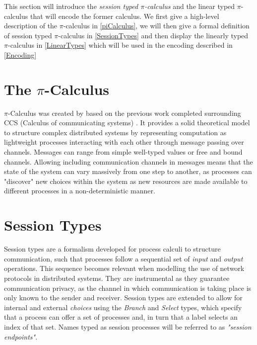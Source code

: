 


This section will introduce the \textit{session typed $\pi$-calculus} \cite{dardha2017session} and the linear typed $\pi$-calculus that will encode the former calculus. We first give a high-level description of the $\pi$-calculus in \autoref{piCalculus}, we will then give a formal definition of session typed $\pi$-calculus in \autoref{SessionTypes} and then display the linearly typed $\pi$-calculus in \autoref{LinearTypes} which will be used in the encoding described in \autoref{Encoding}



\section{The $\pi$-Calculus} \label{piCalculus}
$\pi$-Calculus was created by \citep{milner1992calculus} based on the previous work completed surrounding CCS (Calculus of communicating systems) \cite{milner1980calculus}. It provides a solid theoretical model to structure complex distributed systems by representing computation as lightweight processes interacting with each other through message passing over channels. Messages can range from simple well-typed values or free and bound channels. Allowing including communication channels in messages means that the state of the system can vary massively from one step to another, as processes can "discover" new choices within the system as new resources are made available to different processes in a non-deterministic manner.  

\section{Session Types} \label{SessionTypes}

Session types are a formalism developed for process calculi to structure communication, such that processes follow a sequential set of \textit{input} and \textit{output} operations. This sequence becomes relevant when modelling the use of network protocols in distributed systems. They are instrumental as they guarantee communication privacy, as the channel in which communication is taking place is only known to the sender and receiver. Session types are extended to allow for internal and external \textit{choices} using the \textit{Branch} and \textit{Select} types, which specify that a process can offer a set of processes and, in turn that a label selects an index of that set. Names typed as session processes will be referred to as \textit{"session endpoints"}.

